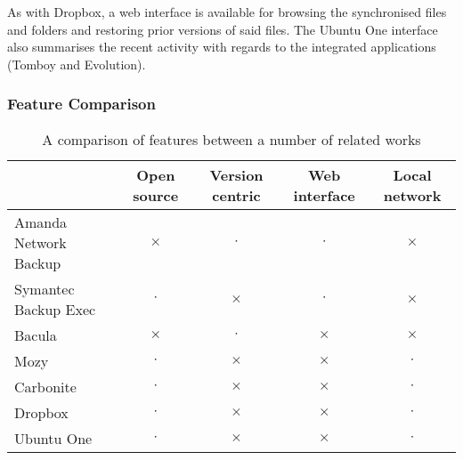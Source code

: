 As with Dropbox, a web interface is available for browsing the synchronised
files and folders and restoring prior versions of said files. The Ubuntu One
interface also summarises the recent activity with regards to the integrated
applications (Tomboy and Evolution).


\subsubsection{Feature Comparison}

\begin{table}[H]
    \centering
    \begin{tabular}{ | l | c | c | c | c | }
        \hline
        & Open source   & Version centric   & Web interface & Local network
            \\ \hline

        Amanda Network Backup   & $\times$  & $\cdot$   & $\cdot$   & $\times$
            \\ \hline

        Symantec Backup Exec    & $\cdot$   & $\times$  & $\cdot$   & $\times$
            \\ \hline

        Bacula                  & $\times$  & $\cdot$   & $\times$  & $\times$
            \\ \hline

        Mozy                    & $\cdot$   & $\times$  & $\times$  & $\cdot$
            \\ \hline

        Carbonite               & $\cdot$   & $\times$  & $\times$  & $\cdot$
            \\ \hline

        Dropbox                 & $\cdot$   & $\times$  & $\times$  & $\cdot$
            \\ \hline

        Ubuntu One              & $\cdot$   & $\times$  & $\times$  & $\cdot$
            \\ \hline
    \end{tabular}
    \caption{A comparison of features between a number of related works}
    \label{tab:feature-comparison}
\end{table}
